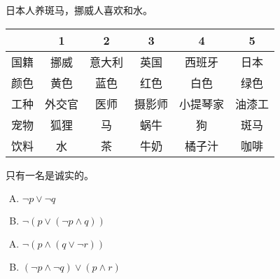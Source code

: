 {{        %
        \begin{practices}
            日本人养斑马，挪威人喜欢和水。

            \begin{table}[H]
                \begin{tabular}{c|c|c|c|c|c}
                    \hline
                    & 1 & 2 & 3 & 4 & 5 \\
                    \hline
                    国籍 & 挪威 & 意大利 & 英国 & 西班牙 & 日本 \\
                    颜色 & 黄色 & 蓝色 & 红色 & 白色 & 绿色 \\
                    工种 & 外交官 & 医师 & 摄影师 & 小提琴家 & 油漆工 \\
                    宠物 & 狐狸 & 马 & 蜗牛 & 狗 & 斑马 \\
                    饮料 & 水 & 茶 & 牛奶 & 橘子汁 & 咖啡 \\
                    \hline
                \end{tabular}
            \end{table}
        \end{practices}

        \begin{practices}
            只有一名是诚实的。
        \end{practices}

        \begin{practices}
            \begin{enumerate}[A.]
                \item $\neg p \vee \neg q$
                \item $\neg (p \vee (\neg p \wedge q))$
            \end{enumerate}
        \end{practices}

        \begin{practices}
            \begin{enumerate}[A.]
                \item $\neg (p \wedge (q \vee \neg r))$
                \item $(\neg p \wedge \neg q) \vee (p \wedge r)$
            \end{enumerate}
        \end{practices}

}}

